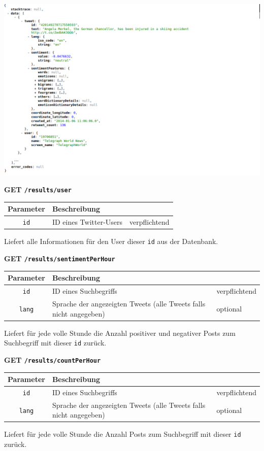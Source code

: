 \includegraphics[scale=0.6]{Bilder/RestApi/GetTweet.png}

\noindent
\textbf{GET \texttt{/results/user}}
\begin{table}[h!]
\begin{tabular}{| c | p{\tweite} | l |}
\hline
	\textbf{Parameter} & \textbf{Beschreibung} &  \\
\hline \hline
 	\texttt{id} & ID eines Twitter-Users & verpflichtend \\
\hline
\end{tabular}
\end{table}
\newline
Liefert alle Informationen für den User dieser \texttt{id} aus der Datenbank.

\newpage
\noindent
\textbf{GET \texttt{/results/sentimentPerHour}}
\begin{table}[h!]
\begin{tabular}{| c | p{\tweite} | l |}
\hline
	\textbf{Parameter} & \textbf{Beschreibung} &  \\
\hline \hline
 	\texttt{id} & ID eines Suchbegriffs & verpflichtend \\
\hline
 	\texttt{lang} & Sprache der angezeigten Tweets (alle Tweets falls nicht angegeben) & optional \\
\hline
\end{tabular}
\end{table}
\newline
Liefert für jede volle Stunde die Anzahl positiver und negativer Posts zum Suchbegriff mit dieser \texttt{id} zurück.

\noindent
\textbf{GET \texttt{/results/countPerHour}}
\begin{table}[h!]
\begin{tabular}{| c | p{\tweite} | l |}
\hline
	\textbf{Parameter} & \textbf{Beschreibung} &  \\
\hline \hline
 	\texttt{id} & ID eines Suchbegriffs & verpflichtend \\
\hline
 	\texttt{lang} & Sprache der angezeigten Tweets (alle Tweets falls nicht angegeben) & optional \\
\hline
\end{tabular}
\end{table}
\newline
Liefert für jede volle Stunde die Anzahl Posts zum Suchbegriff mit dieser \texttt{id} zurück.

